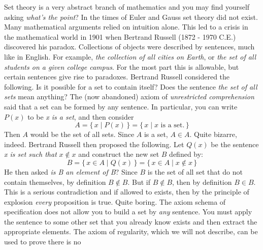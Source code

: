             Set theory is a very abstract branch of mathematics and you may find
            yourself asking \textit{what's the point}? In the times of Euler and
            Gauss set theory did not exist. Many mathematical arguments relied
            on intuition alone. This led to a crisis in the mathematical world
            in 1901 when Bertrand Russell (1872 - 1970 C.E.) discovered his
            paradox. Collections of objects were described by sentences, much
            like in English. For example,
            \textit{the collection of all cities on Earth},
            or \textit{the set of all students on a given college campus}. For
            the most part this is allowable, but certain sentences give rise to
            paradoxes. Bertrand Russell considered the following.
            \textrm{Is it possible for a set to contain itself?} Does the
            sentence \textit{the set of all sets} mean anything? The
            (now abandoned) axiom of \textit{unrestricted comprehension} said
            that a set can be formed by any sentence. In particular, you can
            write $P(x)$ to be \textit{x is a set}, and then consider
            \begin{equation}
                A=\{\,x\;|\;P(x)\,\}=\{\,x\;|\;x\textrm{ is a set.}\,\}
            \end{equation}
            Then $A$ would be the set of all sets. Since $A$ is a set,
            $A\in{A}$. Quite bizarre, indeed. Bertrand Russell then proposed
            the following. Let $Q(x)$ be the sentence
            \textit{x is set such that} $x\notin{x}$ and construct the new
            set $B$ defined by:
            \begin{equation}
                B=\{\,x\in{A}\;|\;Q(x)\,\}=\{\,x\in{A}\;|\;x\notin{x}\,\}
            \end{equation}
            He then asked \textit{is B an element of B}? Since $B$ is the
            set of all set that do not contain themselves, by definition
            $B\notin{B}$. But if $B\notin{B}$, then by definition $B\in{B}$.
            This is a serious contradiction and if allowed to exists, then by
            the principle of explosion \textit{every} proposition is true.
            Quite boring. The axiom schema of specification does not allow you
            to build a set by \textit{any} sentence. You must apply the
            sentence to some other set that you already know exists and then
            extract the appropriate elements. The axiom of regularity, which
            we will not describe, can be used to prove there is no
